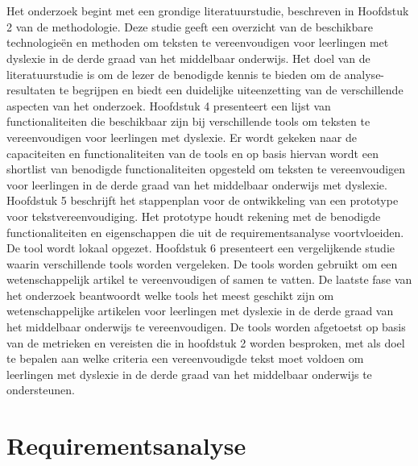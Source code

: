
\chapter{}%
\label{ch:methodologie}

Het onderzoek begint met een grondige literatuurstudie, beschreven in Hoofdstuk 2 van de methodologie. Deze studie geeft een overzicht van de beschikbare technologieën en methoden om teksten te vereenvoudigen voor leerlingen met dyslexie in de derde graad van het middelbaar onderwijs. Het doel van de literatuurstudie is om de lezer de benodigde kennis te bieden om de analyse-resultaten te begrijpen en biedt een duidelijke uiteenzetting van de verschillende aspecten van het onderzoek. Hoofdstuk 4 presenteert een lijst van functionaliteiten die beschikbaar zijn bij verschillende tools om teksten te vereenvoudigen voor leerlingen met dyslexie. Er wordt gekeken naar de capaciteiten en functionaliteiten van de tools en op basis hiervan wordt een shortlist van benodigde functionaliteiten opgesteld om teksten te vereenvoudigen voor leerlingen in de derde graad van het middelbaar onderwijs met dyslexie. Hoofdstuk 5 beschrijft het stappenplan voor de ontwikkeling van een prototype voor tekstvereenvoudiging. Het prototype houdt rekening met de benodigde functionaliteiten en eigenschappen die uit de requirementsanalyse voortvloeiden. De tool wordt lokaal opgezet. Hoofdstuk 6 presenteert een vergelijkende studie waarin verschillende tools worden vergeleken. De tools worden gebruikt om een wetenschappelijk artikel te vereenvoudigen of samen te vatten. De laatste fase van het onderzoek beantwoordt welke tools het meest geschikt zijn om wetenschappelijke artikelen voor leerlingen met dyslexie in de derde graad van het middelbaar onderwijs te vereenvoudigen. De tools worden afgetoetst op basis van de metrieken en vereisten die in hoofdstuk 2 worden besproken, met als doel te bepalen aan welke criteria een vereenvoudigde tekst moet voldoen om leerlingen met dyslexie in de derde graad van het middelbaar onderwijs te ondersteunen.

\chapter{Requirementsanalyse}

